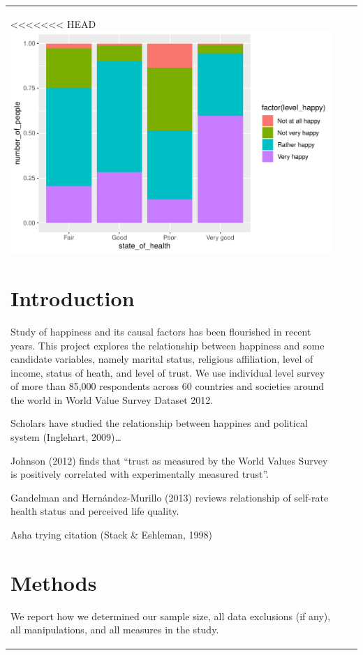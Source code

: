 \documentclass[man, fleqn, noextraspace,floatsintext]{apa6}
\begin{document}
\begin{tabular}{l|l|r}
<<<<<<< HEAD
\includegraphics{610_final_files/figure-latex/trust and health-2.pdf}

\hypertarget{introduction}{%
\section{Introduction}\label{introduction}}

Study of happiness and its causal factors has been flourished in recent years. This project explores the relationship between happiness and some candidate variables, namely marital status, religious affiliation, level of income, status of heath, and level of trust. We use individual level survey of more than 85,000 respondents across 60 countries and societies around the world in World Value Survey Dataset 2012.

Scholars have studied the relationship between happines and political system (Inglehart, 2009)\ldots{}

Johnson (2012) finds that \enquote{trust as measured by the World Values Survey is positively correlated with experimentally measured trust}.

Gandelman and Hernández-Murillo (2013) reviews relationship of self-rate health status and perceived life quality.

Asha trying citation (Stack \& Eshleman, 1998)

\hypertarget{methods}{%
\section{Methods}\label{methods}}

We report how we determined our sample size, all data exclusions (if any), all manipulations, and all measures in the study.


\end{tabular}
\end{document}
